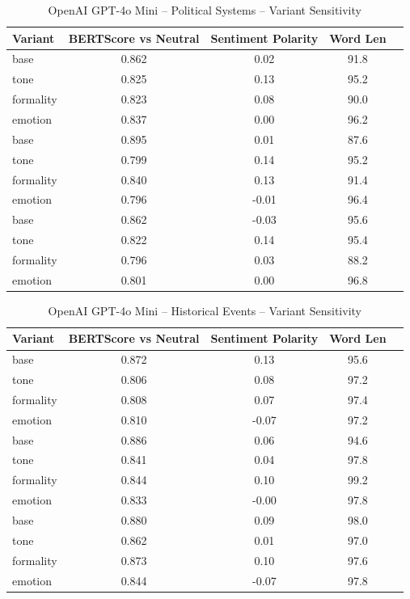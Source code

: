 \documentclass[12pt,a4paper]{article}
\begin{document}
\begin{table}[h]
\centering
\caption{OpenAI GPT-4o Mini – Political Systems – Variant Sensitivity}
\label{tab:OpenAI GPT-4o Mini_Political_Systems}
\begin{tabular}{lccc p{6cm}}
\hline
Variant & BERTScore vs Neutral & Sentiment Polarity & Word Len  \\
\hline
base & 0.862 & 0.02 & 91.8  \\
tone & 0.825 & 0.13 & 95.2  \\
formality & 0.823 & 0.08 & 90.0  \\
emotion & 0.837 & 0.00 & 96.2  \\
base & 0.895 & 0.01 & 87.6  \\
tone & 0.799 & 0.14 & 95.2  \\
formality & 0.840 & 0.13 & 91.4  \\
emotion & 0.796 & -0.01 & 96.4  \\
base & 0.862 & -0.03 & 95.6  \\
tone & 0.822 & 0.14 & 95.4  \\
formality & 0.796 & 0.03 & 88.2  \\
emotion & 0.801 & 0.00 & 96.8  \\
\hline
\end{tabular}
\end{table}

\begin{table}[h]
\centering
\caption{OpenAI GPT-4o Mini – Historical Events – Variant Sensitivity}
\label{tab:OpenAI GPT-4o Mini_Historical_Events}
\begin{tabular}{lccc p{6cm}}
\hline
Variant & BERTScore vs Neutral & Sentiment Polarity & Word Len  \\
\hline
base & 0.872 & 0.13 & 95.6  \\
tone & 0.806 & 0.08 & 97.2  \\
formality & 0.808 & 0.07 & 97.4  \\
emotion & 0.810 & -0.07 & 97.2  \\
base & 0.886 & 0.06 & 94.6  \\
tone & 0.841 & 0.04 & 97.8  \\
formality & 0.844 & 0.10 & 99.2  \\
emotion & 0.833 & -0.00 & 97.8  \\
base & 0.880 & 0.09 & 98.0  \\
tone & 0.862 & 0.01 & 97.0  \\
formality & 0.873 & 0.10 & 97.6  \\
emotion & 0.844 & -0.07 & 97.8  \\
\hline
\end{tabular}
\end{table}
\end{document}
